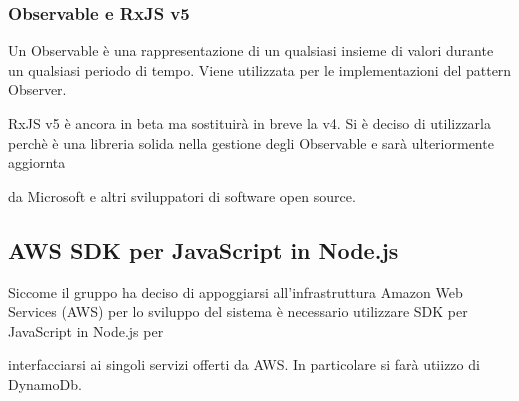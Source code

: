 \subsubsection{Observable e RxJS v5}

Un Observable è una rappresentazione di un qualsiasi insieme di valori durante un qualsiasi periodo di tempo. Viene utilizzata per le implementazioni del pattern Observer.

RxJS v5 è ancora in beta ma sostituirà in breve la v4. Si è deciso di utilizzarla perchè è una libreria solida nella gestione degli Observable e sarà ulteriormente aggiornta

da Microsoft e altri sviluppatori di software open source.


\subsection{AWS SDK per JavaScript in Node.js}

Siccome il gruppo ha deciso di appoggiarsi all'infrastruttura Amazon Web Services (AWS) per lo sviluppo del sistema è necessario utilizzare SDK per JavaScript in Node.js per

interfacciarsi ai singoli servizi offerti da AWS. In particolare si farà utiizzo di DynamoDb.